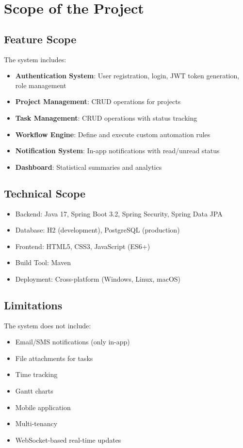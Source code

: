 \documentclass[12pt,a4paper,twoside]{book}
\begin{document}
\section{Scope of the Project}

\subsection{Feature Scope}

The system includes:

\begin{itemize}
    \item \textbf{Authentication System}: User registration, login, JWT token generation, role management
    \item \textbf{Project Management}: CRUD operations for projects
    \item \textbf{Task Management}: CRUD operations with status tracking
    \item \textbf{Workflow Engine}: Define and execute custom automation rules
    \item \textbf{Notification System}: In-app notifications with read/unread status
    \item \textbf{Dashboard}: Statistical summaries and analytics
\end{itemize}

\subsection{Technical Scope}

\begin{itemize}
    \item Backend: Java 17, Spring Boot 3.2, Spring Security, Spring Data JPA
    \item Database: H2 (development), PostgreSQL (production)
    \item Frontend: HTML5, CSS3, JavaScript (ES6+)
    \item Build Tool: Maven
    \item Deployment: Cross-platform (Windows, Linux, macOS)
\end{itemize}

\subsection{Limitations}

The system does not include:
\begin{itemize}
    \item Email/SMS notifications (only in-app)
    \item File attachments for tasks
    \item Time tracking
    \item Gantt charts
    \item Mobile application
    \item Multi-tenancy
    \item WebSocket-based real-time updates
\end{itemize}
\end{document}
